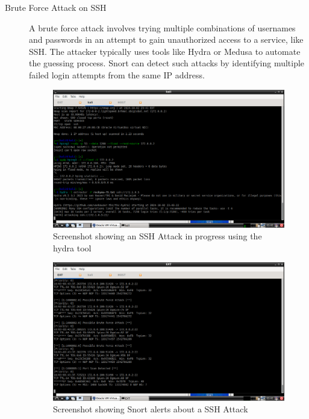 \documentclass[12pt,a4paper]{report}
\begin{document}
\begin{description}
	\item[Brute Force Attack on SSH] A brute force attack involves trying multiple combinations of usernames and passwords in an attempt to gain unauthorized access to a service, like SSH. The attacker typically uses tools like Hydra or Medusa to automate the guessing process. Snort can detect such attacks by identifying multiple failed login attempts from the same IP address.
	
\begin{figure}[H]
    \centering
    \includegraphics[width=\textwidth]{ssh attk.png} 
    \caption{Screenshot showing an SSH Attack in progress using the hydra tool}
    \label{fig:mesh1}
\end{figure}

\begin{figure}[H]
    \centering
    \includegraphics[width=\textwidth]{ssh logs.png} 
    \caption{Screenshot showing Snort alerts about a SSH Attack }
    \label{fig:mesh1}
\end{figure}
	

\end{description}
\end{document}
